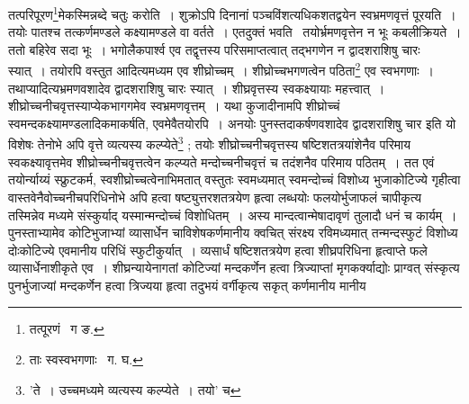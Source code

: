 \documentclass[11pt, openany]{book}
\begin{document}
\noindent तत्परिपूरण\renewcommand{\thefootnote}{१}\footnote{तत्पूरणं \textendash\ ग ङ.}मेकस्मिन्नब्दे चतुः करोति~। शुक्रोऽपि दिनानां पञ्चविंशत्यधिकशतद्वयेन स्वभ्रमणवृत्तं पूरयति~। तयोः 
पातश्च तत्कर्णमण्डले कक्ष्यामण्डले वा वर्तते~। एतदुक्तं भवति \textendash\ तयोर्भ्रमणवृत्तेन न भूः कबलीक्रियते~। ततो बहिरेव सदा भूः~। भगोलैकपार्श्व एव तद्वृत्तस्य परिसमाप्तत्वात् तद्भगणेन न द्वादशराशिषु चारः स्यात्~। तयोरपि वस्तुत आदित्यमध्यम एव 
शीघ्रोच्चम्~। शीघ्रोच्चभगणत्वेन पठिता\renewcommand{\thefootnote}{२}\footnote{ताः स्वस्वभगणाः \textendash\ ग. घ.} एव स्वभगणाः~। तथाप्यादित्यभ्रमणवशादेव द्वादशराशिषु चारः स्यात्~। शीघ्रवृत्तस्य स्वकक्ष्यायाः महत्त्वात्~। शीघ्रोच्चनीचवृत्तस्याप्येकभागगमेव स्वभ्रमणवृत्तम्~। यथा कुजादीनामपि शीघ्रोच्चं स्वमन्दकक्ष्यामण्डलादिकमाकर्षति, एवमेवैतयोरपि~। अनयोः पुनस्तदाकर्षणवशादेव द्वादशराशिषु चार इति यो विशेषः तेनोभे अपि वृत्ते व्यत्यस्य कल्प्येते\renewcommand{\thefootnote}{३}\footnote{'ते~। उच्चमध्यमे व्यत्यस्य कल्प्येते~। तयो'  च} ; तयोः शीघ्रोच्चनीचवृत्तस्य षष्टिशतत्रयांशेनैव परिमाय स्वकक्ष्यावृत्तमेव शीघ्रोच्चनीचवृत्तत्वेन कल्प्यते मन्दोच्चनीचवृत्तं च तदंशनैव परिमाय पठितम्~। तत एवं तयोर्न्याय्यं स्फ्रुटकर्म, स्वशीघ्रोच्चत्वेनाभिमतात् वस्तुतः स्वमध्यमात् स्वमन्दोच्चं विशोध्य भुजाकोटिज्ये गृहीत्वा वास्तवेनैवोच्चनीचपरिधिनोभे अपि हत्वा षष्ट्युत्तरशतत्रयेण हृत्वा लब्धयोः फलयोर्भुजाफलं चापीकृत्य तस्मिन्नेव मध्यमे संस्कुर्याद्
यस्मान्मन्दोच्चं विशोधितम्~। अस्य मान्दत्वान्मेषादावृणं तुलादौ धनं च कार्यम्~। पुनस्ताभ्यामेव कोटिभुजाभ्यां व्यासार्धेन 
चाविशेषकर्णमानीय क्वचित् संरक्ष्य रविमध्यमात् तन्मन्दस्फुटं विशोध्य दोःकोटिज्ये एवमानीय परिधिं स्फुटीकुर्यात्~। व्यसार्धं 
षष्टिशतत्रयेण हत्वा शीघ्रपरिधिना हृत्वाप्ते फले व्यासार्धेनाशीकृते एव~। शीघ्रन्यायेनागतां कोटिज्यां मन्दकर्णेन हत्वा त्रिज्याप्तां मृगकर्क्याद्योः प्राग्वत् संस्कृत्य पुनर्भुजाज्यां मन्दकर्णेन हत्वा त्रिज्यया हृत्वा तदुभयं वर्गीकृत्य सकृत् कर्णमानीय मानीय 

\newpage
\end{document}
